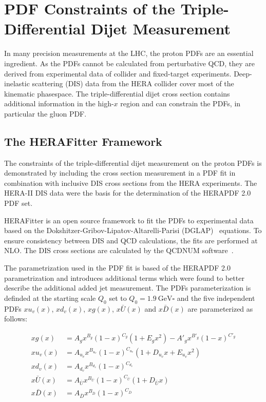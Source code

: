 
\chapter{PDF Constraints of the Triple-Differential Dijet Measurement}
\label{sec:pdf_constraints}

In many precision measurements at the LHC, the proton PDFs are an essential
ingredient. As the PDFs cannot be calculated from perturbative QCD, they are
derived from experimental data of collider and fixed-target experiments.
Deep-inelastic scattering (DIS) data from the HERA collider cover most of the
kinematic phasespace. The triple-differential dijet cross section contains
additional information in the high-$x$ region and can constrain the PDFs, in
particular the gluon PDF. 

\section{The HERAFitter Framework}
\label{section:herafittersetup}

The constraints of the triple-differential dijet measurement on the proton PDFs
is demonstrated by including the cross section measurement in a PDF fit in
combination with inclusive DIS cross sections from the HERA experiments. The
HERA-II DIS data were the basis for the determination of the HERAPDF 2.0 PDF
set.

HERAFitter is an open source framework to fit the PDFs to experimental data
based on the Dokshitzer-Gribov-Lipatov-Altarelli-Parisi
(DGLAP)~\cite{Gribov:1972ri,Altarelli:1977zs,Dokshitzer:1977sg} equations. To
ensure consistency between DIS and QCD calculations, the fits are performed at
NLO. The DIS cross sections are calculated by the QCDNUM
software~\cite{Botje:2010ay}.

The parametrization used in the PDF fit is based of the HERAPDF 2.0
parametrization and introduces additional terms which were found to better
describe the additional added jet measurement. The PDFs parameterization is
definded at the starting scale $Q_0$ set to $Q_0 = \SI{1.9}{\GeV \square}$ and
the five independent PDFs $xu_v(x)$, $xd_v(x)$, $xg(x)$, $x\bar{U}(x)$ and
$x\bar{D}(x)$ are parameterized as follows:

\begin{align}
  xg(x) &= A_g x^{B_g} (1-x)^{C_g} (1 + E_g x^2) - A'_g x^{B'_g} (1-x)^{C'_g} \\
  xu_v(x) &= A_{u_{v}} x^{B_{u_{v}}} (1-x)^{C_{u_{v}}}(1 + D_{u_{v}}x + E_{u_{v}}x^2)\\
  xd_v(x) &= A_{d_v} x^{B_{d_v}} (1-x)^{C_{d_{v}}}\\
  x\bar U(x) &= A_{\bar U} x^{B_{\bar U}} (1-x)^{C_{\bar U}}(1 + D_{\bar U}x)\\
  x\bar D(x) &= A_{\bar D} x^{B_{\bar D}} (1-x)^{C_{\bar D}}
\end{align}

